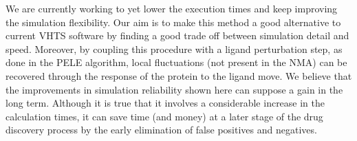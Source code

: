 We are currently working to yet lower the execution times and keep improving the simulation flexibility. Our aim is to make this method a good alternative to current VHTS software by finding a good trade off between simulation detail and speed. Moreover, by coupling this procedure with a ligand perturbation step, as done in the PELE algorithm, local fluctuations (not present in the NMA) can be recovered through the response of the protein to the ligand move. We believe that the improvements in simulation reliability shown here can suppose a gain in the long term. Although it is true that it involves a considerable increase in the calculation times, it can save time (and money) at a later stage of the drug discovery process by the early elimination of false positives and negatives.

\newpage
